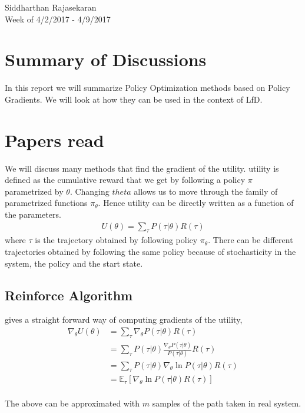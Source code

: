 \documentclass{article}[11pt]
\begin{document}
\begin{center}
Siddharthan Rajasekaran\\
Week of 4/2/2017 - 4/9/2017
\end{center}

\section{Summary of Discussions}
In this report we will summarize Policy Optimization methods based on Policy Gradients. We will look at how they can be used in the context of LfD.  

\section{Papers read}
We will discuss many methods that find the gradient of the utility. utility is defined as the cumulative reward that we get by following a policy $\pi$ parametrized by $\theta$. Changing $theta$ allows us to move through the family of parametrized functions $\pi_\theta$. Hence utility can be directly written as a function of the parameters. 
\begin{align*}
U(\theta) = \sum_\tau P(\tau|\theta)R(\tau)
\end{align*} where $\tau$ is the trajectory obtained by following policy $\pi_\theta$. There can be different trajectories obtained by following the same policy because of stochasticity in the system, the policy and the start state. 
\subsection{Reinforce Algorithm}

\cite{williams1992simple} gives a straight forward way of computing gradients of the utility, 
\begin{align*}
\nabla_\theta U(\theta) &= \sum_\tau \nabla_\theta P(\tau|\theta)R(\tau)\\
&=\sum_\tau P(\tau|\theta) \frac{\nabla_\theta P(\tau|\theta)}{P(\tau|\theta)}R(\tau)\\
&=\sum_\tau P(\tau|\theta) \nabla_\theta \ln P(\tau|\theta) R(\tau)\\
&=\mathbb{E}_\tau [ \nabla_\theta \ln P(\tau|\theta) R(\tau)]\\
\end{align*}

The above can be approximated with $m$ samples of the path taken in real system. 
\end{document}
